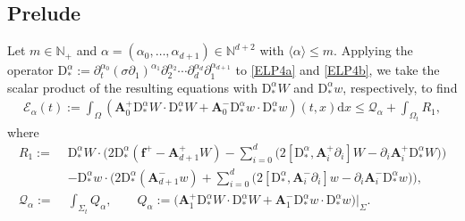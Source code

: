 \documentclass[twoside,11pt]{article}
\numberwithin{equation}{section}
\def\p{\partial}
\begin{document}
	\subsection{Prelude} \label{sec:prelude}
Let $m\in\mathbb{N}_+$ and $\alpha=(\alpha_0,\ldots,\alpha_{d+1})\in\mathbb{N}^{d+2}$ with
$\langle \alpha \rangle \leq m$.	
Applying the operator $\mathrm{D}_*^{\alpha}:=\p_t^{\alpha_0} (\sigma \p_1)^{\alpha_1}\p_2^{\alpha_2} \cdots\p_d^{\alpha_d}  \p_1^{\alpha_{d+1}}
$  %
to \eqref{ELP4a} and \eqref{ELP4b},
we take the scalar product of the resulting equations
with $\mathrm{D}_*^{\alpha} W$ and $\mathrm{D}_*^{\alpha}w$, respectively,
to find
\begin{align}%
 \mathcal{E}_{\alpha}(t)
:=\int_{\Omega} \left(\bm{A}_0^+\mathrm{D}_*^{\alpha}W\cdot \mathrm{D}_*^{\alpha}W
	+ \bm{A}_0^-\mathrm{D}_*^{\alpha}w\cdot \mathrm{D}_*^{\alpha}w\right)(t,x)\mathrm{d}x
 	\leq
	 \mathcal{Q}_{\alpha}+\int_{\Omega_t} {R}_{1},
	 \label{es1}
\end{align}
where
\begin{align}
	\nonumber
	{R}_{1}:=\; &
	\mathrm{D}_*^{\alpha}W\cdot \bigg(
	2\mathrm{D}_*^{\alpha}(\bm{f}^+- {\bm{A}}_{d+1}^+ W)
	-\sum_{i=0}^{d}\big(2[\mathrm{D}_*^{\alpha},{\bm{A}}_i^+\p_i]W
	-\p_i {\bm{A}}_i^+\mathrm{D}_*^{\alpha}W\big) \bigg)\\
	&	
	-	\mathrm{D}_*^{\alpha}w\cdot \bigg(
	2\mathrm{D}_*^{\alpha}({\bm{A}}_{d+1}^- w)
	+\sum_{i=0}^{d}\big(2[\mathrm{D}_*^{\alpha},{\bm{A}}_i^-\p_i]w
	-\p_i {\bm{A}}_i^-\mathrm{D}_*^{\alpha}w\big) \bigg),
 \nonumber %
	\\[2mm]
		\label{Q:def}
\mathcal{Q}_{\alpha}:=\; &\int_{\Sigma_t}{Q}_{\alpha},\qquad 		
{Q}_{\alpha}:=\big(\bm{A}_1^+ \mathrm{D}_*^{\alpha}W\cdot \mathrm{D}_*^{\alpha}W
+
\bm{A}_1^- \mathrm{D}_*^{\alpha}w\cdot \mathrm{D}_*^{\alpha}w\big)\big|_{\Sigma}.	
\end{align}
\end{document}
